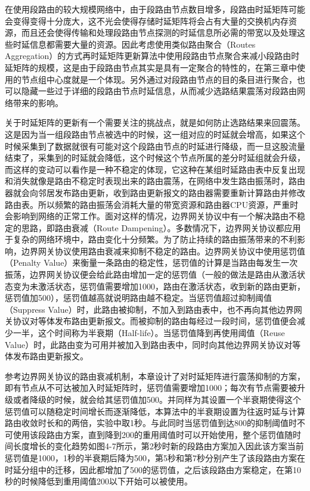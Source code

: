 在使用段路由的较大规模网络中，由于段路由节点数目增多，段路由时延矩阵可能会变得变得十分庞大，这不光会使得存储时延矩阵将会占有大量的交换机内存资源，而且还会使得传输和处理段路由节点探测的时延信息所必需的带宽以及处理这些时延信息都需要大量的资源。因此考虑使用类似路由聚合（Routes Aggregation）的方式再时延矩阵更新算法中使用段路由节点聚合来减小段路由时延矩阵的规模，这是由于段路由节点其实是具有一定聚合的特性的，在第三章中使用的节点组中心度就是一个体现。另外通过对段路由节点的目的条目进行聚合，也可以隐藏一些过于详细的段路由节点时延信息，从而减少选路结果震荡对段路由网络带来的影响。

关于时延矩阵的更新有一个需要关注的挑战点，就是如何防止选路结果来回震荡。这是因为当一组段路由节点被选中的时候，这一组对应的时延就会增高，如果这个时候采集到了数据就很有可能对这个段路由节点的时延进行降级，而一旦这股流量结束了，采集到的时延就会降低，这个时候这个节点所属的差分时延组就会升级，而这样的变动可以看作是一种不稳定的体现，它这种在某组时延路由表中反复出现和消失就像是路由不稳定时表现出来的路由震荡，在网络中发生路由振荡时，路由器就会向邻居发布路由更新，收到路由更新报文的路由器需要重新计算路由并修改路由表。所以频繁的路由振荡会消耗大量的带宽资源和路由器CPU资源，严重时会影响到网络的正常工作。面对这样的情况，边界网关协议中有一个解决路由不稳定的思路，即路由衰减（Route Dampening）。多数情况下，边界网关协议都应用于复杂的网络环境中，路由变化十分频繁。为了防止持续的路由振荡带来的不利影响，边界网关协议使用路由衰减来抑制不稳定的路由。边界网关协议中使用惩罚值（Penalty Value）来衡量一条路由的稳定性，惩罚值的计算是当路由每发生一次振荡，边界网关协议便会给此路由增加一定的惩罚值（一般的做法是路由从激活状态变为未激活状态，惩罚值需要增加1000，路由在激活状态，收到新的路由更新，惩罚值加500），惩罚值越高就说明路由越不稳定。当惩罚值超过抑制阈值（Suppress Value）时，此路由被抑制，不加入到路由表中，也不再向其他边界网关协议对等体发布路由更新报文。而被抑制的路由每经过一段时间，惩罚值便会减少一半，这个时间称为半衰期（Half-life）。当惩罚值降到再使用阈值（Reuse Value）时，此路由变为可用并被加入到路由表中，同时向其他边界网关协议对等体发布路由更新报文。

参考边界网关协议的路由衰减机制，本章设计了对时延矩阵进行震荡抑制的方案，即有节点从不可达被加入时延矩阵时，惩罚值需要增加1000；每次有节点需要被升级或者降级的时候，就会给其惩罚值加500。并同样为其设置一个半衰期使得这个惩罚值可以随稳定时间增长而逐渐降低，本算法中的半衰期设置为往返时延与计算路由收敛时长和的两倍，实验中取1秒。与此同时当惩罚值到达800的抑制阈值时不可使用该段路由方案，直到降到200的重用阈值时可以开始使用，整个惩罚值随时间长度增长的变化趋势如图4-7所示，第2秒时新的段路由方案加入因此该方案当前惩罚值是1000，1秒的半衰期后降为500，第5秒和第7秒分别产生了该段路由方案在时延分组中的迁移，因此都增加了500的惩罚值，之后该段路由方案稳定，在第10秒的时候降低到重用阈值200以下开始可以被使用。

